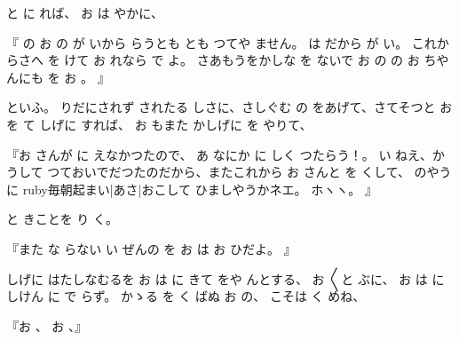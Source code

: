 と
に
れば、
お
は
やかに、

『
の
お
の
が
いから
らうとも
とも
つてや
ません。
は
だから
が
い。
これからさへ
を
けて
お
れなら
で
よ。
さあもうをかしな
を
ないで
お
の
の
お
ちやんにも
を
お
。
』

といふ。
りだにされず
されたる
しさに、さしぐむ
の
をあげて、さてそつと
お
を
て
しげに
すれば、
お
もまた
かしげに
を
やりて、

『お
さんが
に
えなかつたので、
あ
なにか
に
しく
つたらう！。
い
ねえ、かうして
つておいでだつたのだから、またこれから
お
さんと
を
くして、
のやうに
ruby{毎朝起}{まい|あさ|おこ}して
ひましやうかネエ。
ホヽヽ。
』

と
きことを
り
く。

『また
な
らない
い
ぜんの
を
お
は
お
ひだよ。
』

しげに
はたしなむるを
お
は
に
きて
をや
んとする、
お
〳〵と
ぶに、
お
は
にしけん
に
で
らず。
かゝる
を
く
ばぬ
お
の、
こそは
く
めね、

『お
、
お
、』

